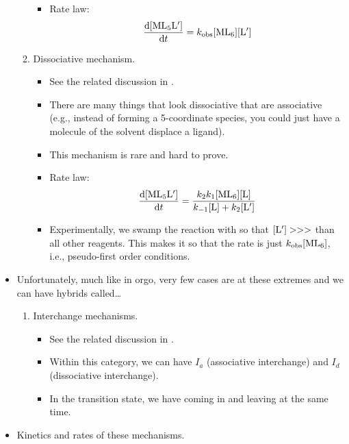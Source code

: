 \documentclass[../notes.tex]{subfiles}
\begin{document}
\begin{itemize}
\begin{enumerate}
\begin{itemize}
            \item Rate law:
            \begin{equation*}
                \dv{\ce{[ML5L$'$]}}{t} = k_\text{obs}\ce{[ML6][L$'$]}
            \end{equation*}
        \end{itemize}
        \item Dissociative mechanism.
        \begin{itemize}
            \item See the related discussion in \textcite{bib:CHEM20100Notes}.
            \item There are many things that look dissociative that are associative (e.g., instead of forming a 5-coordinate species, you could just have a molecule of the solvent displace a ligand).
            \item This mechanism is rare and hard to prove.
            \item Rate law:
            \begin{equation*}
                \dv{\ce{[ML5L$'$]}}{t} = \frac{k_2k_1\ce{[ML6][L]}}{k_{-1}\ce{[L]}+k_2\ce{[L$'$]}}
            \end{equation*}
            \item Experimentally, we swamp the reaction with  so that $\ce{[L$'$]}>>>$ than all other reagents. This makes it so that the rate is just $k_\text{obs}\ce{[ML6]}$, i.e., pseudo-first order conditions.
        \end{itemize}
    \end{enumerate}
    \item Unfortunately, much like in orgo, very few cases are at these extremes and we can have hybrids called\dots
    \begin{enumerate}[resume]
        \item Interchange mechanisms.
        \begin{itemize}
            \item See the related discussion in \textcite{bib:CHEM20100Notes}.
            \item Within this category, we can have $I_a$ (associative interchange) and $I_d$ (dissociative interchange).
            \item In the transition state, we have  coming in and  leaving at the same time.
        \end{itemize}
    \end{enumerate}
    \item Kinetics and rates of these mechanisms.

\end{itemize}
\end{document}
